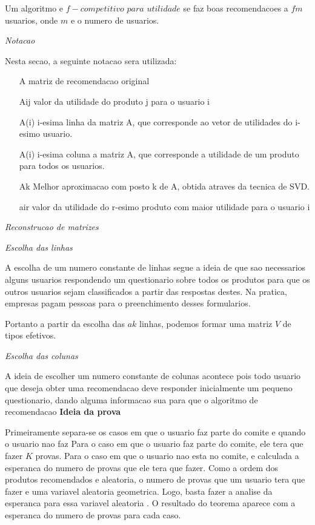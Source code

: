 \documentclass[a4paper,10pt]{article}
\begin{document}
Um algoritmo e $f-competitivo$ $para$ $utilidade$
se faz boas recomendacoes a $fm$ usuarios, onde $m$ e o numero de usuarios. 

\textit{Notacao}

Nesta secao, a seguinte notacao sera utilizada:

\begin{itemize}
\item[A] matriz de recomendacao original
\item[Aij] valor da utilidade do produto j para o usuario i
\item[A(i)] i-esima linha da matriz A, que corresponde ao vetor de utilidades do i-esimo usuario.
\item[A(i)] i-esima coluna a matriz A, que corresponde a utilidade de um produto para todos os usuarios.
\item[Ak] Melhor aproximacao com posto k de A, obtida atraves da tecnica de SVD.
\item[air] valor da utilidade do r-esimo produto com maior utilidade para o usuario i 
\end{itemize}

\textit{Reconstrucao de matrizes}

\textit{Escolha das linhas}

A escolha de um numero constante de linhas segue a ideia de que sao necessarios
alguns usuarios respondendo um questionario sobre todos os produtos para que os
outros usuarios sejam classificados a partir das respostas destes. Na pratica, empresas
pagam pessoas para o preenchimento desses formularios.

Portanto a partir da escolha das $ak$ linhas, podemos formar uma matriz $V$ de tipos efetivos.

\textit{Escolha das colunas}

A ideia de escolher um numero constante de colunas acontece pois todo usuario
que deseja obter uma recomendacao deve responder inicialmente um pequeno 
questionario, dando alguma informacao sua para que o algoritmo de recomendacao
\textbf{Ideia da prova}

Primeiramente separa-se os casos em que o usuario faz parte do comite e quando
o usuario nao faz 
Para o caso em que o usuario faz parte do comite, ele tera que fazer $K$ provas.
Para o caso em que o usuario nao esta no comite, e calculada a esperanca do numero 
de provas que ele tera que fazer. Como a ordem dos produtos
recomendados e aleatoria, o numero de provas que um usuario tera que fazer
e uma variavel aleatoria geometrica. Logo, basta fazer a analise da esperanca
para essa variavel aleatoria \cite{MG}.
O resultado do teorema aparece com a esperanca do numero de provas para
cada caso.
\end{document}
